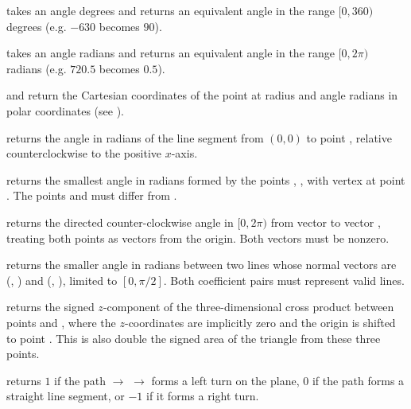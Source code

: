 \begin{compactitem}
  \item {} takes an angle  degrees and returns an equivalent angle in the range $[0, 360)$ degrees (e.g. $-630$ becomes $90$).
  \item {} takes an angle  radians and returns an equivalent angle in the range $[0, 2\pi)$ radians (e.g. $720.5$ becomes $0.5$).
  \item {} and  return the Cartesian coordinates of the point at radius  and angle  radians in polar coordinates (see ).
  \item {} returns the angle in radians of the line segment from $(0, 0)$ to point , relative counterclockwise to the positive $x$-axis.
  \item {} returns the smallest angle in radians formed by the points , ,  with vertex at point . The points  and  must differ from .
  \item {} returns the directed counter-clockwise angle in $[0, 2\pi)$ from vector  to vector , treating both points as vectors from the origin. Both vectors must be nonzero.
  \item {} returns the smaller angle in radians between two lines whose normal vectors are (, ) and (, ), limited to $[0, \pi / 2]$. Both coefficient pairs must represent valid lines.
  \item {} returns the signed $z$-component of the three-dimensional cross product between points  and , where the $z$-coordinates are implicitly zero and the origin is shifted to point . This is also double the signed area of the triangle from these three points.
  \item {} returns $1$ if the path  $\to$  $\to$  forms a left turn on the plane, $0$ if the path forms a straight line segment, or $-1$ if it forms a right turn.
\end{compactitem}

